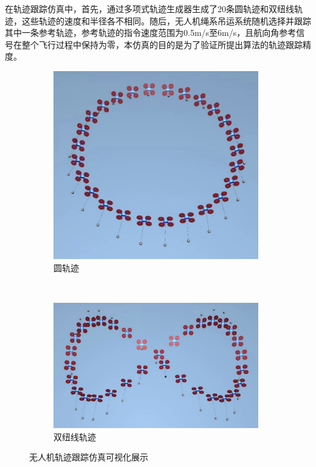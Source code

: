 \documentclass[lang=chs, degree=master, blindreview=false, winfonts=true]{yanputhesis}
\begin{document}
在轨迹跟踪仿真中，首先，通过多项式轨迹生成器生成了20条圆轨迹和双纽线轨迹，这些轨迹的速度和半径各不相同。随后，无人机绳系吊运系统随机选择并跟踪其中一条参考轨迹，参考轨迹的指令速度范围为0.5m/s至6m/s，且航向角参考信号在整个飞行过程中保持为零，本仿真的目的是为了验证所提出算法的轨迹跟踪精度。
\begin{figure}[hbt!]
	\centering
	\begin{subfigure}[t]{0.9\textwidth}
		\centering
		\includegraphics[width=0.98\textwidth]{picture/kk/yuan.jpg}
		\vspace{-0.2cm}
		\caption{圆轨迹}
		\label{yuana}
	\end{subfigure}\\[1.2ex] %
	\begin{subfigure}[t]{0.9\textwidth}
		\centering
		\includegraphics[width=0.98\textwidth]{picture/kk/bazi.jpg}
		\vspace{-0.2cm}
		\caption{双纽线轨迹}
		\label{bazib}
	\end{subfigure}
	\caption{无人机轨迹跟踪仿真可视化展示}
	\label{mujoco}
\end{figure}
\end{document}
